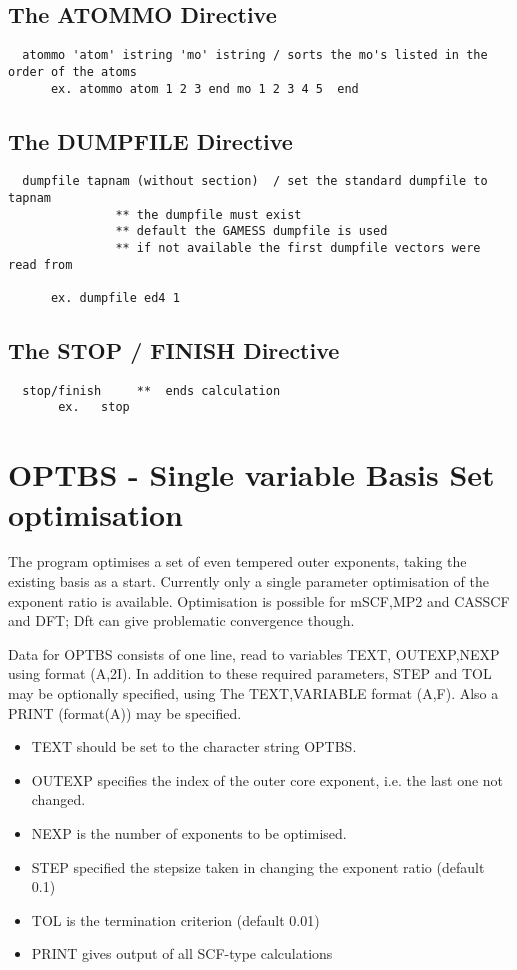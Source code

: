 \documentclass[11pt,fleqn]{article}
\begin{document}
\subsection{The ATOMMO Directive}

{
\footnotesize
\begin{verbatim} 
  atommo 'atom' istring 'mo' istring / sorts the mo's listed in the order of the atoms
      ex. atommo atom 1 2 3 end mo 1 2 3 4 5  end  
\end{verbatim}
}

\subsection{The DUMPFILE Directive}

{
\footnotesize
\begin{verbatim} 
  dumpfile tapnam (without section)  / set the standard dumpfile to tapnam
               ** the dumpfile must exist
               ** default the GAMESS dumpfile is used
               ** if not available the first dumpfile vectors were read from

      ex. dumpfile ed4 1
\end{verbatim}
}


\subsection{The STOP / FINISH Directive}

{
\begin{verbatim} 
  stop/finish     **  ends calculation
       ex.   stop
\end{verbatim}
}

\section{OPTBS - Single variable Basis Set  optimisation}

The program optimises a set of even tempered outer exponents, taking the
existing basis as a start. Currently only a single parameter optimisation  of
the exponent ratio is available. Optimisation is possible for mSCF,MP2 and CASSCF
and DFT; Dft can give problematic convergence though.

Data for  OPTBS  consists of one line, read to variables
TEXT, OUTEXP,NEXP using format (A,2I).
In addition to these required parameters, STEP and TOL may be  optionally  specified, using
The TEXT,VARIABLE format (A,F). Also a PRINT (format(A)) may be specified.
\begin{itemize}
\item TEXT should be set to the character string OPTBS.
\item OUTEXP specifies the index of the outer core exponent, i.e. the last one not changed.
\item NEXP  is the number of exponents to be optimised.
\item STEP specified the stepsize taken in changing the exponent ratio (default 0.1)
\item TOL is the termination criterion (default 0.01)
\item PRINT gives output of all SCF-type calculations
\end{itemize}
\end{document}
